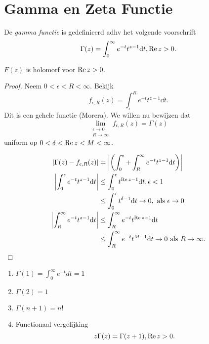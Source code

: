 \section{Gamma en Zeta Functie} \label{sec:gamma_en_zeta_functie}

\begin{definitie}
	De \emph{gamma functie} is gedefinieerd adhv het volgende voorschrift \[
		\Gamma(z) = \int_{0}^{\infty} e^{-t}t ^{z -1} \mathrm{d} t, \operatorname{Re} z > 0 
	.\] 
\end{definitie}
\begin{propositie}
	$F(z)$ is holomorf voor $\operatorname{Re} z > 0$.
\end{propositie}
\begin{proof}
	Neem $0 < \epsilon < R < \infty$. 
	Bekijk  
	\[
		f_{\epsilon, R}(z) = \int_{\epsilon}^{R} e^{-t}t ^{z-1} \dd t 
	.\]
	Dit is een gehele functie (Morera).
	We willen nu bewijzen dat \[
		\lim_{\substack{\epsilon \to 0 \\ R \to \infty}}  f_{\epsilon, R} (z) = \Gamma(z)
	\] 
	uniform op $0 < \delta < \operatorname{Re} z < M < \infty$. 

	\begin{align*}
		\left|  \Gamma(z) - f_{\epsilon, R}(z) \right| &= \left| \left( \int_{0}^{\epsilon} + \int_{R}^{\infty} e^{-t} t^{z-1}\mathrm{d} t   \right)  \right| \\
		\left| \int_{0}^{\epsilon} e^{-t}t ^{z -1} \mathrm{d} t \right|  &\le \int_{0}^{\epsilon} t ^{\operatorname{Re} z - 1} \mathrm{d} t , \epsilon < 1 \\
								 &\le \int_{0}^{\epsilon} t ^{\delta -1} \mathrm{d} t \to 0 , \text{ als } \epsilon \to 0 \\
		\left| \int_{R}^{\infty} e^{-t}t ^{z - 1}\mathrm{d} t \right| &\le \int_{R}^{\infty} e^{-t} t ^{\operatorname{Re} z - 1} \mathrm{d} t \\
							      &\le \int_{R}^{\infty} e^{-t} t ^{M -1} \mathrm{d} t \to 0 \text{ als } R \to \infty 
	.\end{align*}


\end{proof}
\begin{eigenschap}
\begin{enumerate}
	\item $\Gamma(1) = \int_{0}^{\infty} e^{-t}dt = 1 $ 
	\item $\Gamma(2) = 1 $
	\item $\Gamma(n + 1) = n!$
	\item Functionaal vergelijking \[
			z \Gamma(z) = \Gamma(z + 1), \operatorname{Re} z > 0
	.\] 
\end{enumerate}		
\end{eigenschap}
